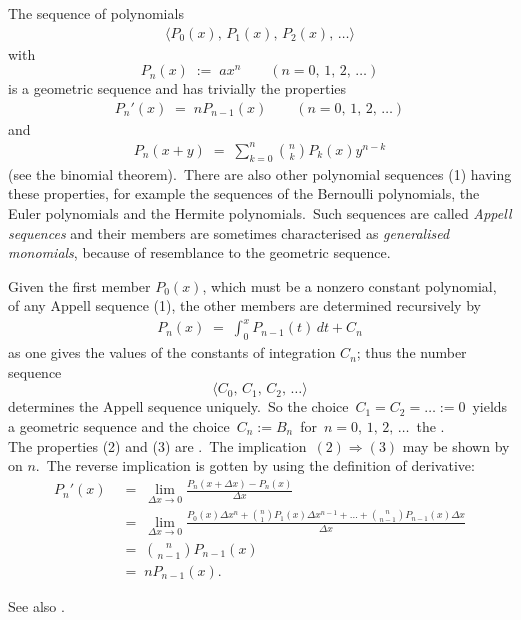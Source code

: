 \documentclass[12pt]{article}
\theoremstyle{definition}
\begin{document}

The sequence of polynomials
\begin{align}
\langle P_0(x),\, P_1(x),\, P_2(x),\, \ldots\rangle
\end{align}
with
$$P_n(x) \;:=\; ax^n \qquad (n = 0,\,1,\,2,\,\ldots)$$
is a geometric sequence and has trivially the properties
\begin{align}
P_n'(x) \;=\; nP_{n-1}(x) \qquad (n = 0,\,1,\,2,\,\ldots)
\end{align}
and
\begin{align}
P_n(x\!+\!y) \;=\; \sum_{k=0}^n {n \choose k}P_k(x)y^{n-k}
\end{align}
(see the binomial theorem).\, There are also other polynomial sequences (1) having these properties, for example the sequences of the Bernoulli polynomials, the Euler polynomials and the Hermite polynomials.\, Such sequences are called \emph{Appell sequences} and their members are sometimes characterised as \emph{generalised monomials}, because of resemblance to the geometric sequence.

Given the first member $P_0(x)$, which must be a nonzero constant polynomial, of any Appell sequence (1), the other members are determined recursively by
\begin{align}
P_n(x) \;=\; \int_0^x\!\!P_{n-1}(t)\,dt+C_n
\end{align}
as one gives the values of the constants of integration $C_n$; thus the number sequence
$$\langle C_0,\,C_1,\,C_2,\,\ldots\rangle$$
determines the Appell sequence uniquely.\, So the choice \,$C_1 = C_2 = \ldots := 0$\, yields a geometric sequence and the choice \,$C_n := B_n$\, for\, $n = 0,\,1,\,2,\,\ldots$\, the .\\

The properties (2) and (3) are 
.\, The implication\, 
$(2)\Rightarrow(3)$ may be shown by 
 on $n$.\, The reverse 
implication is gotten by using the definition of derivative:
\begin{align*}
P_n'(x) &\;=\;  \lim_{\Delta x \to 0}\frac{P_n(x\!+\!\Delta x)-P_n(x)}{\Delta x}\\
& \;=\; \lim_{\Delta x \to 0}\frac{P_0(x)\Delta x^n+{n \choose 1}P_1(x)\Delta x^{n-1}+\ldots+{n \choose n-1}P_{n-1}(x)\Delta x}{\Delta x}\\
& \;=\; {n \choose n\!-\!1}P_{n-1}(x)\\
& \;=\; nP_{n-1}(x).
\end{align*}



See also .






\end{document}
